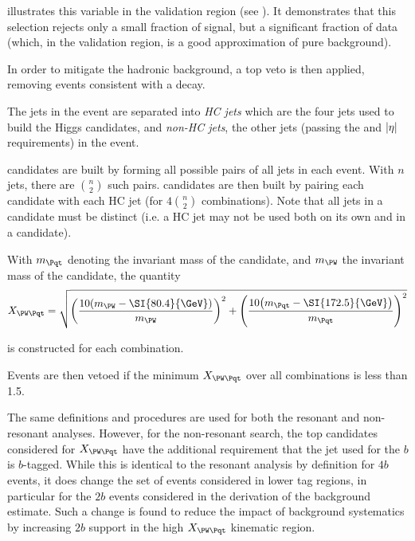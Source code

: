 \Fig{\ref{fig:deta-hh-plots}} illustrates this variable in the validation region
(see \Sect{\ref{sec:kin-reg-def}}). It demonstrates that this selection rejects
only a small fraction of signal, but a significant fraction of data (which, in
the validation region, is a good approximation of pure background).


In order to mitigate the hadronic \ttbar background, a top veto is then applied,
removing events consistent with a 
decay.

The jets in the event are separated into \emph{HC jets} which are
the four jets used to build the Higgs candidates, and \emph{non-HC jets}, the
other jets (passing the \pt and $\abs{\eta}$ requirements) in the event.

\PW candidates are built by forming all possible pairs of all jets in each event.
With $n$ jets, there are $\binom{n}{2}$ such pairs. \Pqt candidates are then built
by pairing each \PW candidate with each HC jet (for $4\binom{n}{2}$ combinations).
Note that all jets in a \Pqt candidate must be distinct (i.e. a HC jet may not be
used both on its own and in a \PW candidate).

With $m_{\Pqt}$ denoting the invariant mass of the \Pqt candidate, and $m_{\PW}$
the invariant mass of the \PW candidate, the quantity
\begin{equation}
	\label{eqn:xwt-def}
	X_{\PW\Pqt} = \sqrt{\qty(\frac{10\qty(m_{\PW} - \SI{80.4}{\GeV})}{m_{\PW}})^{2} + \qty(\frac{10\qty(m_{\Pqt} - \SI{172.5}{\GeV})}{m_{\Pqt}})^{2}}
\end{equation}

is constructed for each combination.

Events are then vetoed if the minimum $X_{\PW\Pqt}$ over all combinations is
less than 1.5.

The same definitions and procedures are used for both the resonant and non-resonant analyses.
However, for the non-resonant search, the top candidates considered for $X_{\PW\Pqt}$ have the 
additional requirement that the jet used for the $b$ is $b$-tagged. While this is identical
to the resonant analysis by definition for $4b$ events, it does change the set of events 
considered in lower tag regions, in particular for the $2b$ events considered in the derivation
of the background estimate. Such a change is found to reduce the impact of background systematics
by increasing $2b$ support in the high $X_{\PW\Pqt}$ kinematic region. 

